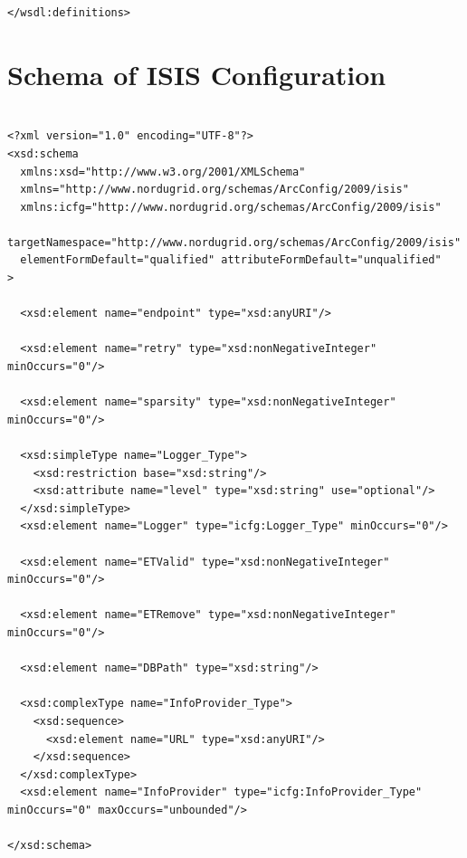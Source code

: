 \documentclass{book}
\begin{document}
\begin{verbatim}
</wsdl:definitions>
\end{verbatim}


\section{Schema of ISIS Configuration}
\label{annex:isis_configuration_schema}
\begin{verbatim}

<?xml version="1.0" encoding="UTF-8"?>
<xsd:schema
  xmlns:xsd="http://www.w3.org/2001/XMLSchema"
  xmlns="http://www.nordugrid.org/schemas/ArcConfig/2009/isis"
  xmlns:icfg="http://www.nordugrid.org/schemas/ArcConfig/2009/isis"
  targetNamespace="http://www.nordugrid.org/schemas/ArcConfig/2009/isis"
  elementFormDefault="qualified" attributeFormDefault="unqualified"
>

  <xsd:element name="endpoint" type="xsd:anyURI"/>

  <xsd:element name="retry" type="xsd:nonNegativeInteger" minOccurs="0"/>

  <xsd:element name="sparsity" type="xsd:nonNegativeInteger" minOccurs="0"/>

  <xsd:simpleType name="Logger_Type">
    <xsd:restriction base="xsd:string"/>
    <xsd:attribute name="level" type="xsd:string" use="optional"/>
  </xsd:simpleType>
  <xsd:element name="Logger" type="icfg:Logger_Type" minOccurs="0"/>

  <xsd:element name="ETValid" type="xsd:nonNegativeInteger" minOccurs="0"/>

  <xsd:element name="ETRemove" type="xsd:nonNegativeInteger" minOccurs="0"/>

  <xsd:element name="DBPath" type="xsd:string"/>

  <xsd:complexType name="InfoProvider_Type">
    <xsd:sequence>
      <xsd:element name="URL" type="xsd:anyURI"/>
    </xsd:sequence>
  </xsd:complexType>
  <xsd:element name="InfoProvider" type="icfg:InfoProvider_Type" minOccurs="0" maxOccurs="unbounded"/>

</xsd:schema>

\end{verbatim}

\end{document}

